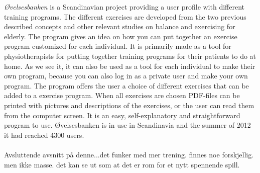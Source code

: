 \emph{{Ø}velsesbanken} is a Scandinavian project providing a user profile with different training programs. The different exercises are developed from the two previous described concepts and other relevant studies on balance and exercising for elderly. The program gives an idea on how you can put together an exercise program customized for each individual. It is primarily made as a tool for physiotherapists for putting together training programs for their patients to do at home. As we see it, it can also be used as a tool for each individual to make their own program, because you can also log in as a private user and make your own program. The program offers the user a choice of different exercises that can be added to a exercise program. When all exercises are chosen PDF-files can be printed with pictures and descriptions of the exercises, or the user can read them from the computer screen. It is an easy, self-explanatory and straightforward program to use. {Ø}velsesbanken is in use in Scandinavia and the summer of 2012 it had reached 4300 users. \cite{ovelsesbank}\\ \\

Avsluttende avsnitt på denne...det funker med mer trening. finnes noe forskjellig. men ikke masse. det kan se ut som at det er rom for et nytt spennende spill. 
